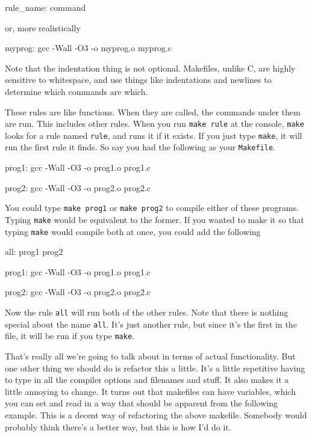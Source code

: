 \documentclass[ebook,11pt,oneside,openany]{memoir}
\newcommand{\cf}[1]{\texttt{#1}}
\begin{document}
\begin{code}[language=make]
rule_name:
	command
\end{code}

\noindent
or, more realistically

\begin{code}[language=make]
myprog:
	gcc -Wall -O3 -o myprog.o myprog.c
\end{code}

Note that the indentation thing is not optional. Makefiles, unlike C, are highly sensitive to whitespace, and use things like indentations and newlines to determine which commands are which.

These rules are like functions. When they are called, the commands under them are run. This includes other rules. When you run \cf{make rule} at the console, \cf{make} looks for a rule named \cf{rule}, and runs it if it exists. If you just type \cf{make}, it will run the first rule it finds. So say you had the following as your \cf{Makefile}.

\begin{code}[language=make]
prog1:
	gcc -Wall -O3 -o prog1.o prog1.c
    
prog2:
	gcc -Wall -O3 -o prog2.o prog2.c
\end{code}

You could type \cf{make prog1} or \cf{make prog2} to compile either of these programs. Typing \cf{make} would be equivalent to the former. If you wanted to make it so that typing \cf{make} would compile both at once, you could add the following

\begin{code}[language=make]
all: prog1 prog2

prog1:
	gcc -Wall -O3 -o prog1.o prog1.c
    
prog2:
	gcc -Wall -O3 -o prog2.o prog2.c
\end{code}

\noindent
Now the rule \cf{all} will run both of the other rules. Note that there is nothing special about the name \cf{all}. It's just another rule, but since it's the first in the file, it will be run if you type \cf{make}.

That's really all we're going to talk about in terms of actual functionality. But one other thing we should do is refactor this a little. It's a little repetitive having to type in all the compiler options and filenames and stuff. It also makes it a little annoying to change. It turns out that makefiles can have variables, which you can set and read in a way that should be apparent from the following example. This is a decent way of refactoring the above makefile. Somebody would probably think there's a better way, but this is how I'd do it.
\end{document}
